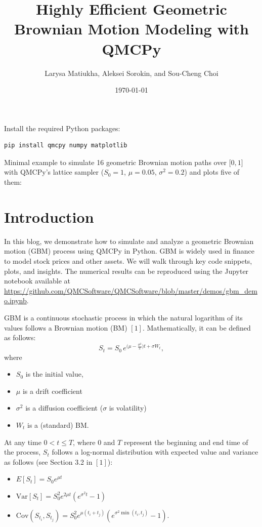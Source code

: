 \documentclass{article}
\title{Highly Efficient Geometric Brownian Motion Modeling with QMCPy}
\author{Larysa Matiukha, Aleksei Sorokin, and Sou-Cheng Choi}
\date{\today}
\begin{document}
\maketitle

\begin{tcolorbox}[title=Quick Start,colback=blue!1,colframe=blue!30!black,breakable]
Install the required Python packages:
%
\begin{lstlisting}[language=bash,basicstyle=\ttfamily,frame=none,numbers=none]
    pip install qmcpy numpy matplotlib
\end{lstlisting}

Minimal example to simulate 16 geometric Brownian motion paths over $\lbrack 0,1\rbrack$ with QMCPy's lattice sampler ($S_0=1$, $\mu=0.05$, $\sigma^2=0.2$) and plots five of them:
%

\end{tcolorbox}


\section{Introduction}

In this blog, we demonstrate how to simulate and analyze a geometric Brownian motion (GBM) process using QMCPy in Python.
GBM is widely used in finance to model stock prices and other assets. 
We will walk through key code snippets, plots, and insights. The numerical results can be reproduced using the Jupyter notebook available at \href{gbm\_demo.ipynb}{\url{https://github.com/QMCSoftware/QMCSoftware/blob/master/demos/gbm\_demo.ipynb}}.

GBM is a continuous stochastic process in which the natural logarithm of its values follows a Brownian motion (BM) $[1]$.
Mathematically, it can be defined as follows:
\begin{equation}
S_t = S_0 \, e^{\bigl(\mu - \tfrac{\sigma^2}{2}\bigr)  t + \sigma W_t}, \label{gbm}
\end{equation}
where
\begin{itemize}
\item $S_0$ is the initial value, 
\item $\mu$ is a drift coefficient
\item $\sigma^2$ is a diffusion coefficient ($\sigma$ is volatility)
\item $W_t$ is a (standard) BM.
\end{itemize}

At any time $0 < t \le T$, where $0$ and $T$ represent the beginning and end time of the process, $S_t$ follows a log-normal distribution with expected value and variance as follows (see Section 3.2 in $[1]$):
\begin{itemize}
\item
 $E[S_t] = S_0 e^{\mu t}$
\item $\text{Var}[S_t] = S_0^2 e^{2\mu t}(e^{\sigma^2 t} - 1)$
\item   $  
    \text{Cov}(S_{t_i}, S_{t_j}) = S_0^2 e^{\mu(t_i + t_j)} \left(e^{\sigma^2 \min(t_i, t_j)} - 1\right).$
\end{itemize}
\end{document}

